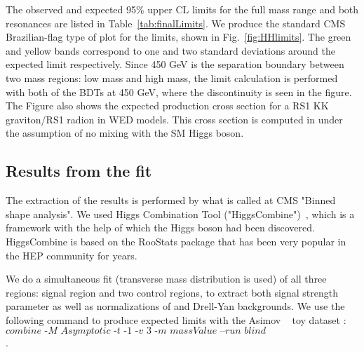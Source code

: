 The observed and expected 95\% upper CL limits for the full mass range
and both resonances are listed in Table~\ref{tab:finalLimits}. We produce the standard CMS Brazilian-flag type of plot for the limits, shown in Fig.~\ref{fig:HHlimits}. The green and yellow
bands correspond to one and two standard deviations around
the expected limit respectively. Since 450 GeV is the separation boundary between two mass regions: low mass and high mass, the limit calculation is performed with both of the BDTs at 450 GeV, where the discontinuity is
seen in the figure. The Figure also shows the expected production
cross section for a RS1 KK graviton/RS1 radion in WED models. %
This cross section is computed in \cite{Oliveira:2014kla}
under the assumption of no mixing with the SM Higgs boson.

\subsection{Results from the fit}


The extraction of the results is performed by what is called at CMS "Binned shape analysis". We used Higgs Combination Tool ("HiggsCombine")~\cite{HiggsCombine}, which is a framework with the help of which the Higgs boson had been discovered. HiggsCombine is based on the RooStats package that has been very popular in the HEP community for years. 

We do a simultaneous fit (\mTHH transverse mass distribution is used) of all three
regions: signal region and two control regions, to extract both
signal strength parameter as well as normalizations of \ttbar and
Drell-Yan backgrounds. We use the following command to produce expected limits with the Asimov ~\cite{Cowan:2010js} toy dataset :  \hfill \break
$\textit{combine 
-M Asymptotic -t -1 -v 3 -m massValue --run blind
comb\_card\_massValue.txt}$.





